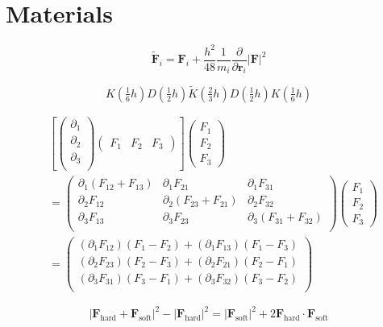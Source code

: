 \documentclass[11pt]{jsarticle}
\begin{document}
\section{Materials}
\[
\tilde{ \bm F}_i = \bm F_i + \frac{h^2}{48} \frac{1}{m_i} \frac{\partial}{\partial \bm r_i} \left| \bm F \right|^2
\]

\[
	K(\tfrac16 h) D(\tfrac12 h) \tilde K(\tfrac23 h) D(\tfrac12 h) K(\tfrac16 h)
\]

\[
\begin{aligned}
&
\left[
\begin{pmatrix}
\partial_1 \\ 
\partial_2 \\ 
\partial_3 \\ 
\end{pmatrix}
\begin{pmatrix}
F_1 & F_2 & F_3
\end{pmatrix}
\right]
\begin{pmatrix}
F_1 \\ F_2 \\ F_3
\end{pmatrix} \\
&=
\begin{pmatrix}
\partial_1 (F_{12} + F_{13}) & \partial_1 F_{21} & \partial_1 F_{31} \\
\partial_2 F_{12} & \partial_2 (F_{23} + F_{21} ) & \partial_2 F_{32} \\
\partial_3 F_{13} & \partial_3 F_{23}  & \partial_3 (F_{31} + F_{32}) \\
\end{pmatrix}
\begin{pmatrix}
F_1 \\ F_2 \\ F_3
\end{pmatrix} \\
&=
\begin{pmatrix}
(\partial_1 F_{12})(F_1 - F_2) + (\partial_1 F_{13})(F_1 - F_3) \\
(\partial_2 F_{23})(F_2 - F_3) + (\partial_2 F_{21})(F_2 - F_1) \\
(\partial_3 F_{31})(F_3 - F_1) + (\partial_3 F_{32})(F_3 - F_2) \\
\end{pmatrix}
\end{aligned}
\]

\[
	| \bm F_\text{hard} + \bm F_\text{soft}|^2 - | \bm F_\text{hard}|^2 = | \bm F_\text{soft}|^2 + 2 \bm F_\text{hard} \cdot \bm F_\text{soft}
\]
\end{document}
